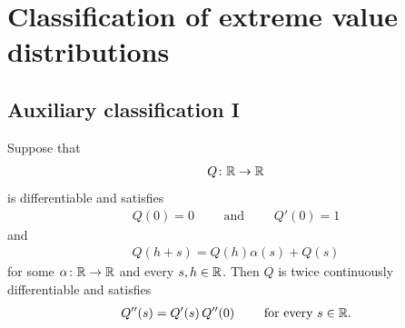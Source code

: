 \chapter{Classification of extreme value distributions}

\section{Auxiliary classification I}

\begin{lemma}
  \label{lem:ode-of-order-two-for-Q}
  \leanok
  Suppose that
  \begin{align*}
  Q \colon \mathbb{R} \to \mathbb{R}
  \end{align*}
  is differentiable and satisfies
  \begin{align*}
  Q(0) = 0 \qquad \text{ and } \qquad Q'(0) = 1
  \end{align*}
  and
  \begin{align*}
  Q(h+s) = Q(h) \alpha(s) + Q(s)
  \end{align*}
  for some $\alpha \colon \mathbb{R} \to \mathbb{R}$ and every $s,h \in \mathbb{R}$.
  Then $Q$ is twice continuously differentiable and satisfies
  \begin{align}
    Q''(s) = Q'(s) \, Q''(0) \qquad \text{ for every } s \in \mathbb{R} .
  \end{align}
\end{lemma}
